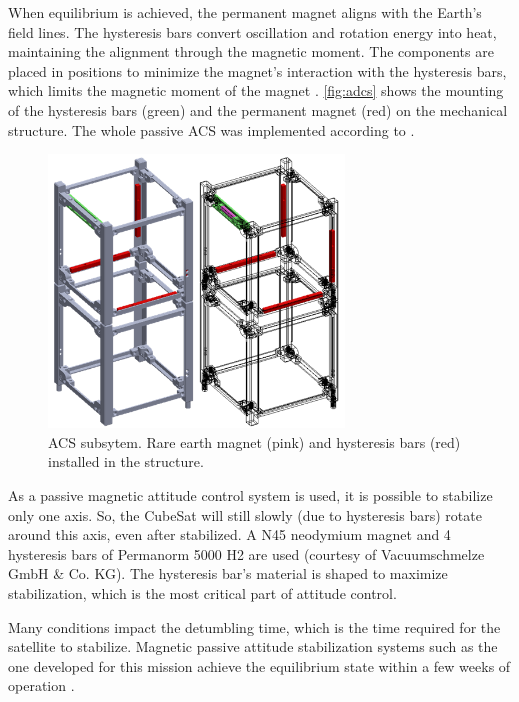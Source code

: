 When equilibrium is achieved, the permanent magnet aligns with the Earth's field lines. The hysteresis bars convert oscillation and rotation energy into heat, maintaining the alignment through the magnetic moment. The components are placed in positions to minimize the magnet's interaction with the hysteresis bars, which limits the magnetic moment of the magnet \cite{francois2010}. \autoref{fig:adcs} shows the mounting of the hysteresis bars (green) and the permanent magnet (red) on the mechanical structure. The whole passive ACS was implemented according to \cite{francois2010}.

\begin{figure}[!ht]
    \begin{center}
        \includegraphics[width=0.7\textwidth]{figures/subsystems/adcs}
        \caption{ACS subsytem. Rare earth magnet (pink) and hysteresis bars (red) installed in the structure.}
        \label{fig:adcs}
    \end{center}
\end{figure}

As a passive magnetic attitude control system is used, it is possible to stabilize only one axis. So, the CubeSat will still slowly (due to hysteresis bars) rotate around this axis, even after stabilized. A N45 neodymium magnet and 4 hysteresis bars of Permanorm 5000 H2 are used (courtesy of Vacuumschmelze GmbH \& Co. KG). The hysteresis bar's material is shaped to maximize stabilization, which is the most critical part of attitude control.

Many conditions impact the detumbling time, which is the time required for the satellite to stabilize. Magnetic passive attitude stabilization systems such as the one developed for this mission achieve the equilibrium state within a few weeks of operation \cite{santoni2009}.

